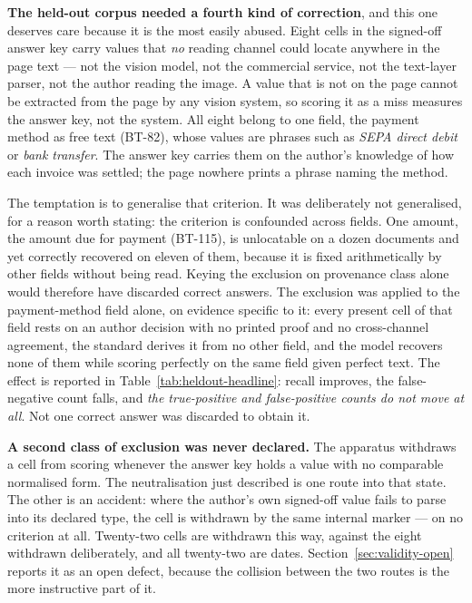 \textbf{The held-out corpus needed a fourth kind of correction}, and this one deserves care
because it is the most easily abused. Eight cells in the signed-off answer key carry values
that \emph{no} reading channel could locate anywhere in the page text --- not the vision model,
not the commercial service, not the text-layer parser, not the author reading the image. A
value that is not on the page cannot be extracted from the page by any vision system, so
scoring it as a miss measures the answer key, not the system. All eight belong to one
field, the payment method as free text (BT-82), whose values are phrases such as
\emph{SEPA direct debit} or \emph{bank transfer}. The answer key carries them on the
author's knowledge of how each invoice was settled; the page nowhere prints a phrase
naming the method.

The temptation is to generalise that criterion. It was deliberately not generalised, for a
reason worth stating: the criterion is confounded across fields. One amount, the amount due
for payment (BT-115), is unlocatable on a dozen documents and yet correctly recovered on
eleven of them, because it is fixed arithmetically by other fields without being read.
Keying the exclusion on provenance class alone
would therefore have discarded correct answers. The exclusion was applied to the
payment-method field alone, on evidence specific to it: every present cell of that field rests on an author decision with
no printed proof and no cross-channel agreement, the standard derives it from no other field,
and the model recovers none of them while scoring perfectly on the same field given perfect
text. The effect is reported in Table~\ref{tab:heldout-headline}: recall improves, the
false-negative count falls, and \emph{the true-positive and false-positive counts do not move at
all}. Not one correct answer was discarded to obtain it.

\textbf{A second class of exclusion was never declared.} The apparatus withdraws a cell from
scoring whenever the answer key holds a value with no comparable normalised form. The
neutralisation just described is one route into that state. The other is an accident: where the
author's own signed-off value fails to parse into its declared type, the cell is withdrawn by
the same internal marker --- on no criterion at all. Twenty-two cells are withdrawn this way,
against the eight withdrawn deliberately, and all twenty-two are dates.
Section~\ref{sec:validity-open} reports it as an open defect, because the collision between the two
routes is the more instructive part of it.

